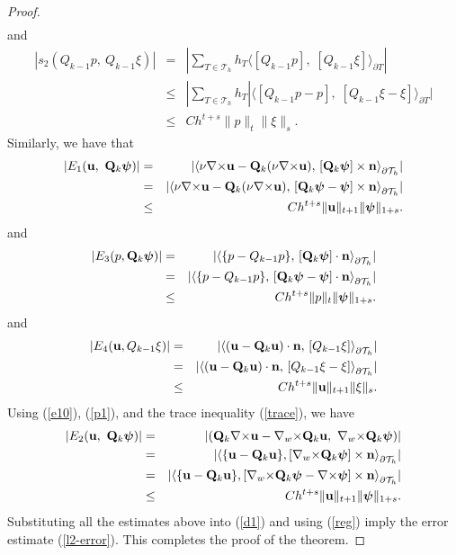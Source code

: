 \documentclass[11pt]{amsart}
\newcommand{\bu}{{\bf u}}
\newcommand{\bQ}{{\bf Q}}
\newcommand{\curl}{{\nabla\times}}
\newcommand{\cw}{{\nabla_w\times}}
\def\bpsi{{\boldsymbol{\psi}}}
\def\T{{\mathcal T}}
\def\pT{{\partial T}}
\def\l{{\langle}}
\def\r{{\rangle}}
\def\bn{{\bf n}}
\begin{document}
\begin{proof}
\begin{eqnarray*}
\end{eqnarray*}
and
\begin{eqnarray*}
|s_2(Q_{k-1} p,\ Q_{k-1}\xi)|&=&|\sum_{T\in\T_h} h_T\langle [Q_{k-1} p],\; [Q_{k-1}\xi]\rangle_\pT|\\
&\le &|\sum_{T\in\T_h}h_T |\langle [Q_{k-1}p- p],\; [Q_{k-1}\xi-\xi]\rangle_\pT|\\
&\le& Ch^{t+s}\|p\|_{t} \|\xi\|_{s}.
\end{eqnarray*}
Similarly, we have  that
\begin{eqnarray*}
|E_1(\bu,\ \bQ_k\bpsi)|&=& |\l\nu\curl\bu-\bQ_k(\nu\curl\bu),\,[\bQ_k\bpsi]\times\bn\r_{\partial\T_h}|\\
&=& |\l\nu\curl\bu-\bQ_k(\nu\curl\bu),\,[\bQ_k\bpsi-\bpsi]\times\bn\r_{\partial\T_h}|\\
&\le& Ch^{t+s}\|\bu\|_{t+1} \|\bpsi\|_{1+s}.
\end{eqnarray*}
and
\begin{eqnarray*}
|E_3(p,\bQ_k\bpsi)|&=& |\l \{p-Q_{k-1}p\},\,[\bQ_k\bpsi]\cdot\bn\r_{\partial\T_h}|\\
&=& |\l \{p-Q_{k-1}p\},\,[\bQ_k\bpsi-\bpsi]\cdot\bn\r_{\partial\T_h}|\\
&\le& Ch^{t+s}\|p\|_{t} \|\bpsi\|_{1+s}.
\end{eqnarray*}
and
\begin{eqnarray*}
|E_4(\bu,Q_{k-1}\xi)|&=&|\l (\bu-\bQ_k\bu)\cdot\bn,\,[Q_{k-1}\xi]\r_{\partial\T_h}|\\
&=&|\l (\bu-\bQ_k\bu)\cdot\bn,\,[Q_{k-1}\xi-\xi]\r_{\partial\T_h}|\\
&\le& Ch^{t+s}\|\bu\|_{t+1} \|\xi\|_{s}.
\end{eqnarray*}
Using (\ref{e10}),  (\ref{p1}),      and the trace inequality (\ref{trace}), we have
\begin{eqnarray*}
|E_2(\bu,\ \bQ_k\bpsi)|&=&|(\bQ_k\curl\bu-\cw\bQ_k\bu,\ \cw\bQ_k\bpsi)|\\
&=& |\l \{\bu-\bQ_k\bu\}, [\cw\bQ_k\bpsi]\times\bn\r_{\partial\T_h}|\\
&=&| \l \{\bu-\bQ_k\bu\}, [\cw\bQ_k\bpsi-\curl\bpsi]\times\bn\r_{\partial\T_h}|\\
&\le& Ch^{t+s}\|\bu\|_{t+1} \|\bpsi\|_{1+s}.
\end{eqnarray*}
Substituting all the estimates above into (\ref{d1}) and using (\ref{reg})
imply the  error estimate (\ref{l2-error}). This completes
the proof of the theorem.
\end{proof}
\end{document}
